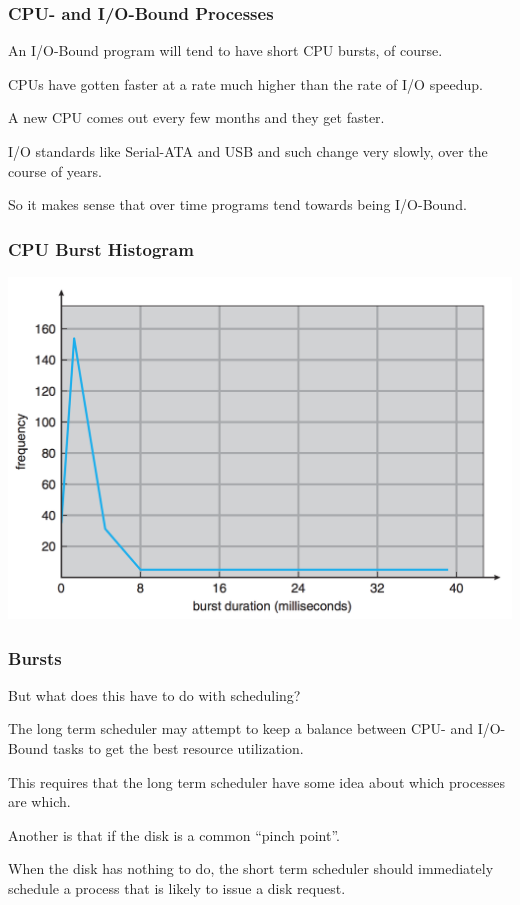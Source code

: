 \begin{frame}
\frametitle{CPU- and I/O-Bound Processes}

An I/O-Bound program will tend to have short CPU bursts, of course. 

CPUs have gotten faster at a rate much higher than the rate of I/O speedup. 

A new CPU comes out every few months and they get faster. 

I/O standards like Serial-ATA and USB and such change very slowly, over the course of years. 

So it makes sense that over time programs tend towards being I/O-Bound. 

\end{frame}

\begin{frame}
\frametitle{CPU Burst Histogram}

\begin{center}
\includegraphics[width=\textwidth]{images/cpu-burst-histogram.png}
\end{center}

\end{frame}

\begin{frame}
\frametitle{Bursts}

But what does this have to do with scheduling? 

The long term scheduler may attempt to keep a balance between CPU- and I/O-Bound tasks to get the best resource utilization. 

This requires that the long term scheduler have some idea about which processes are which.

Another is that if the disk is a common ``pinch point''. 

When the disk has nothing to do, the short term scheduler should immediately schedule a process that is likely to issue a disk request.
\end{frame}



